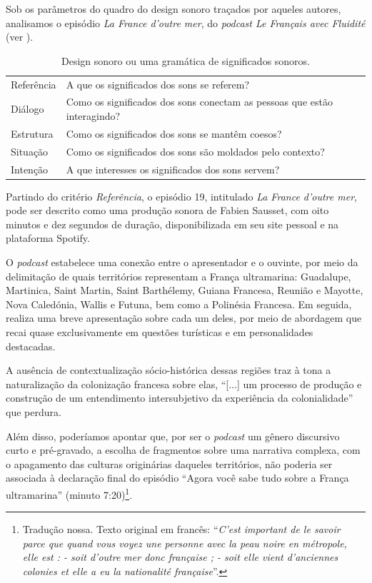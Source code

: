 \documentclass[portuguese]{textolivre}
\begin{document}
Sob os parâmetros do quadro do design sonoro traçados por aqueles autores, analisamos o episódio \textit{La France d’outre mer}, do \textit{podcast Le Français avec Fluidité} (ver ).

\begin{table}[h!]
\centering
\begin{threeparttable}
\caption{Design sonoro ou uma gramática de significados sonoros.}
\label{tab01}
\begin{tabular}{p{2cm} p{9cm}}
\toprule
Referência & A que os significados dos sons se referem? \\
Diálogo & Como os significados dos sons conectam as pessoas que estão interagindo? \\
Estrutura & Como os significados dos sons se mantêm coesos? \\
Situação & Como os significados dos sons são moldados pelo contexto? \\
Intenção & A que interesses os significados dos sons servem? \\
\bottomrule
\end{tabular}
\end{threeparttable}
\end{table}

Partindo do critério \emph{Referência}, o episódio 19, intitulado \textit{La France d’outre mer}, pode ser descrito como uma produção sonora de Fabien Sausset, com oito minutos e dez segundos de duração, disponibilizada em seu site pessoal e na plataforma Spotify.

O \textit{podcast} estabelece uma conexão entre o apresentador e o ouvinte, por meio da delimitação de quais territórios representam a França ultramarina: Guadalupe, Martinica, Saint Martin, Saint Barthélemy, Guiana Francesa, Reunião e Mayotte, Nova Caledónia, Wallis e Futuna, bem como a Polinésia Francesa. Em seguida, realiza uma breve apresentação sobre cada um deles, por meio de abordagem que recai quase exclusivamente em questões turísticas e em personalidades destacadas.

A ausência de contextualização sócio-histórica dessas regiões traz à tona a naturalização da colonização francesa sobre elas, “[...] um processo de produção e construção de um entendimento intersubjetivo da experiência da colonialidade” \cite[p. 85]{veronelli_sobre_2021} que perdura.

Além disso, poderíamos apontar que, por ser o \textit{podcast} um gênero discursivo curto e pré-gravado, a escolha de fragmentos sobre uma narrativa complexa, com o apagamento das culturas originárias daqueles territórios, não poderia  ser associada à declaração final do episódio “Agora você sabe tudo sobre a França ultramarina” (minuto 7:20)\footnote{Tradução nossa. Texto original em francês: “\textit{C’est important de le savoir parce que quand vous voyez une personne avec la peau noire en métropole, elle est : - soit d’outre mer donc française ; - soit elle vient d’anciennes colonies et elle a eu la nationalité française}”.}.
\end{document}
